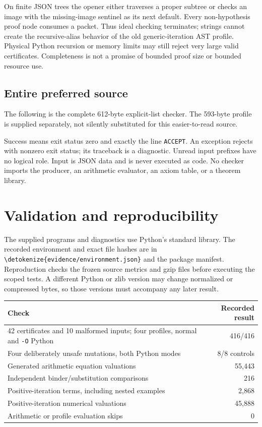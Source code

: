 \documentclass[11pt,letterpaper]{article}
\theoremstyle{definition}\newtheorem{definition}[theorem]{Definition}
\theoremstyle{remark}\newtheorem{remark}[theorem]{Remark}
\newcommand{\file}[1]{\expandafter\nolinkurl\expandafter{\detokenize{#1}}}
\begin{document}
On finite JSON trees the opener either traverses a proper subtree or
checks an image with the missing-image sentinel as its next default.
Every non-hypothesis proof node consumes a packet. Thus ideal checking
terminates; strings cannot create the recursive-alias behavior of the
old generic-iteration AST profile. Physical Python recursion or memory
limits may still reject very large valid certificates. Completeness is
not a promise of bounded proof size or bounded resource use.

\subsection{Entire preferred source}

The following is the complete 612-byte explicit-list checker. The
593-byte profile is supplied separately, not silently substituted for
this easier-to-read source.


Success means exit status zero and exactly the line \texttt{ACCEPT}.
An exception rejects with nonzero exit status; its traceback is a
diagnostic. Unread input prefixes have no logical role. Input is JSON
data and is never executed as code. No checker imports the producer,
an arithmetic evaluator, an axiom table, or a theorem library.




\section{Validation and reproducibility}

The supplied programs and diagnostics use Python's standard library.
The recorded environment and exact file hashes are in
\file{evidence/environment.json} and the package manifest. Reproduction
checks the frozen source metrics and gzip files before executing the
scoped tests. A different Python or zlib version may change normalized
or compressed bytes, so those versions must accompany any later result.

\begin{center}\small
\begin{tabular}{p{.66\linewidth}r}
\toprule
Check & Recorded result\\
\midrule
42 certificates and 10 malformed inputs; four profiles, normal and
\texttt{-O} Python &416/416\\
Four deliberately unsafe mutations, both Python modes &8/8 controls\\
Generated arithmetic equation valuations &55,443\\
Independent binder/substitution comparisons &216\\
Positive-iteration terms, including nested examples &2,868\\
Positive-iteration numerical valuations &45,888\\
Arithmetic or profile evaluation skips &0\\
\bottomrule
\end{tabular}
\end{center}
\end{document}
